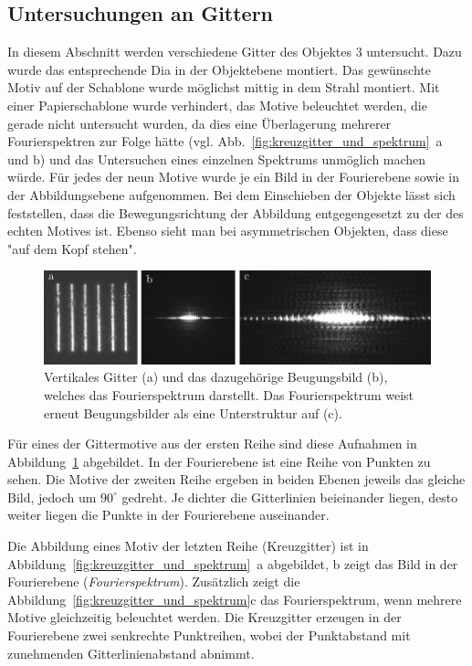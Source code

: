 


\subsection{Untersuchungen an Gittern}
In diesem Abschnitt werden verschiedene Gitter des Objektes 3 untersucht. Dazu wurde das entsprechende Dia in der Objektebene montiert. Das gewünschte Motiv auf der Schablone wurde möglichst mittig in dem Strahl montiert. Mit einer Papierschablone wurde verhindert, das Motive beleuchtet werden, die gerade nicht untersucht wurden, da dies eine Überlagerung mehrerer Fourierspektren zur Folge hätte (vgl. Abb.~\ref{fig:kreuzgitter_und_spektrum}~a und b) und das Untersuchen eines einzelnen Spektrums unmöglich machen würde. Für jedes der neun Motive wurde je ein Bild in der Fourierebene sowie in der Abbildungsebene aufgenommen. Bei dem Einschieben der Objekte lässt sich feststellen, dass die Bewegungsrichtung der Abbildung entgegengesetzt zu der des echten Motives ist. Ebenso sieht man bei asymmetrischen Objekten, dass diese "auf dem Kopf stehen".


\begin{figure}[ht]
	\centering
	\includegraphics{images/Regina/abb13.pdf}
	\caption[Gitter mit Fourierspektrum]{
		Vertikales Gitter (a) und das dazugehörige Beugungsbild (b), welches das Fourierspektrum darstellt. Das Fourierspektrum weist erneut Beugungsbilder als eine Unterstruktur auf (c).
	}
	\label{fig:gitter_und_spektrum}
\end{figure}

Für eines der Gittermotive aus der ersten Reihe sind diese Aufnahmen in Abbildung~\ref{fig:gitter_und_spektrum} abgebildet. In der Fourierebene ist eine Reihe von Punkten zu sehen. Die Motive der zweiten Reihe ergeben in beiden Ebenen jeweils das gleiche Bild, jedoch um $90^\circ$ gedreht. Je dichter die Gitterlinien beieinander liegen, desto weiter liegen die Punkte in der Fourierebene auseinander.

Die Abbildung eines Motiv der letzten Reihe (Kreuzgitter) ist in Abbildung~\ref{fig:kreuzgitter_und_spektrum}~a abgebildet, b zeigt das Bild in der Fourierebene (\textit{Fourierspektrum}). Zusätzlich zeigt die Abbildung~\ref{fig:kreuzgitter_und_spektrum}c das Fourierspektrum, wenn mehrere Motive gleichzeitig beleuchtet werden. Die Kreuzgitter erzeugen in der Fourierebene zwei senkrechte Punktreihen, wobei der Punktabstand mit zunehmenden Gitterlinienabstand abnimmt.

